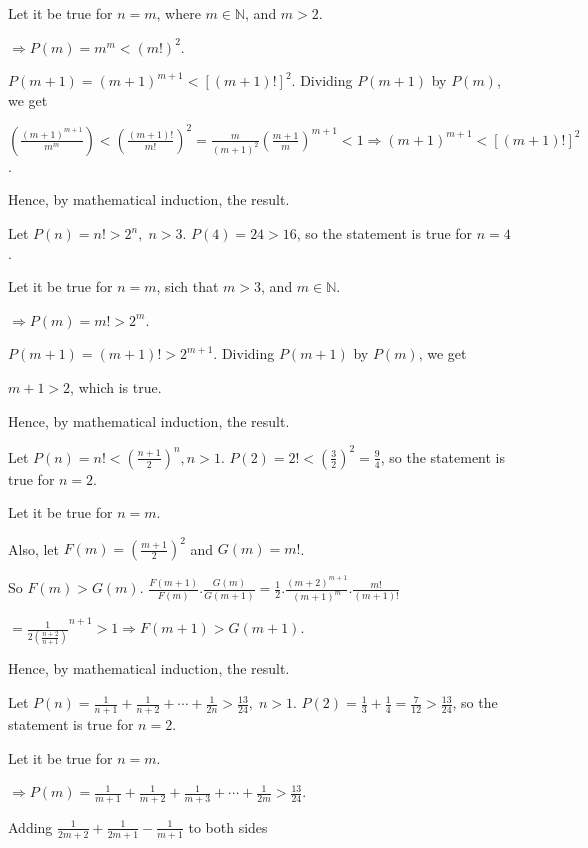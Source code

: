   Let it be true for $n = m$, where $m\in\mathbb{N}$, and $m > 2$.

  $\Rightarrow P(m) = m^m < (m!)^2$.

  $P(m + 1) = (m + 1)^{m + 1} < [(m + 1)!]^2$. Dividing $P(m + 1)$ by $P(m)$, we get

  $\left(\frac{(m + 1)^{m + 1}}{m^m}\right) <\left(\frac{(m + 1)!}{m!}\right)^2 = \frac{m}{(m +
    1)^2}\left(\frac{m + 1}{m}\right)^{m + 1} < 1

  \Rightarrow (m + 1)^{m  + 1} < [(m + 1)!]^2$.

  Hence, by mathematical induction, the result.
\item Let $P(n) = n! > 2^n,\;n>3$. $P(4) = 24 > 16$, so the statement is true for $n = 4$.

  Let it be true for $n = m$, sich that $m > 3$, and $m\in\mathbb{N}$.

  $\Rightarrow P(m) = m! > 2^m$.

  $P(m + 1) = (m + 1)! > 2^{m + 1}$. Dividing $P(m + 1)$ by $P(m)$, we get

  $m + 1 > 2$, which is true.

  Hence, by mathematical induction, the result.
\item Let $P(n) = n! < \left(\frac{n + 1}{2}\right)^n, n > 1$. $P(2) = 2! < \left(\frac{3}{2}\right)^2 =
  \frac{9}{4}$, so the statement is true for $n = 2$.

  Let it be true for $n = m$.

  Also, let $F(m) = \left(\frac{m + 1}{2}\right)^2$ and $G(m) = m!$.

  So $F(m) > G(m)$. $\frac{F(m + 1)}{F(m)}.\frac{G(m)}{G(m + 1)} = \frac{1}{2}.\frac{(m + 2)^{m + 1}}{(m +
    1)^m}.\frac{m!}{(m + 1)!}$

  $= \frac{1}{2\left(\frac{n + 2}{n + 1}\right)}^{n + 1}> 1 \Rightarrow F(m + 1) > G(m + 1)$.

  Hence, by mathematical induction, the result.
\item Let $P(n) = \frac{1}{n + 1} + \frac{1}{n + 2} + \cdots + \frac{1}{2n} > \frac{13}{24},\;n>1$. $P(2) =
  \frac{1}{3} + \frac{1}{4} = \frac{7}{12} > \frac{13}{24}$, so the statement is true for $n = 2$.

  Let it be true for $n = m$.

  $\Rightarrow P(m) = \frac{1}{m + 1} +\frac{1}{m + 2} + \frac{1}{m + 3} + \cdots + \frac{1}{2m} >
  \frac{13}{24}$.

  Adding $\frac{1}{2m + 2} + \frac{1}{2m + 1} - \frac{1}{m + 1}$ to both sides

